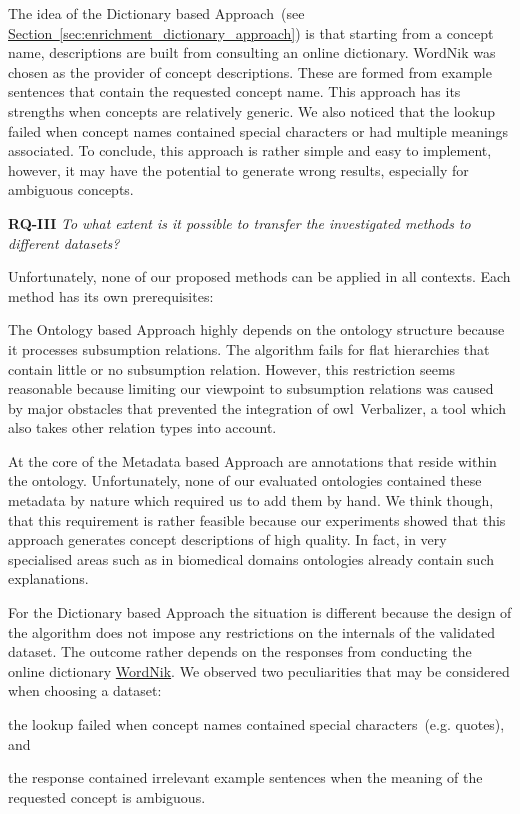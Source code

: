 The idea of the Dictionary based Approach~(see \hyperref[sec:enrichment_dictionary_approach]{Section~\ref*{sec:enrichment_dictionary_approach}})
is that starting from a concept name, descriptions are built from consulting an online dictionary. WordNik was chosen as the provider of concept descriptions. These are formed from example sentences that contain the requested concept name. This approach has its strengths when concepts are relatively generic. We also noticed that the lookup failed when concept names contained special characters or had multiple meanings associated. 
To conclude, this approach is rather simple and easy to implement, however, it may have the potential to generate wrong results, especially for ambiguous concepts. 


\textbf{RQ-III} \emph{To what extent is it possible to transfer the investigated methods to different datasets?}

Unfortunately, none of our proposed methods can be applied in all contexts. Each method has its own prerequisites:

The Ontology based Approach highly depends on the ontology structure because it processes subsumption relations. The algorithm fails for flat hierarchies that contain little or no subsumption relation. However, this restriction seems reasonable because limiting our viewpoint to subsumption relations was caused by major obstacles that prevented the integration of \gls{owl}~Verbalizer, a tool which also takes other relation types into account. 

At the core of the Metadata based Approach are annotations that reside within the ontology. Unfortunately, none of our evaluated ontologies contained these metadata by nature which required us to add them by hand. We think though, that this requirement is rather feasible because our experiments showed that this approach generates concept descriptions of high quality.  In fact, in very specialised areas such as in biomedical domains ontologies already contain such explanations. 

For the Dictionary based Approach the situation is different because the design of the algorithm does not impose any restrictions on the internals of the validated dataset. The outcome rather depends on the responses from conducting the online dictionary \hyperref[sec:wordnik]{WordNik}. We observed two peculiarities that may be considered when choosing a dataset:
\begin{inparaenum}[i)]
	\item the lookup failed when concept names contained special characters~(e.g. quotes), and
	\item the response contained irrelevant example sentences when the meaning of the requested concept is ambiguous.
\end{inparaenum}


